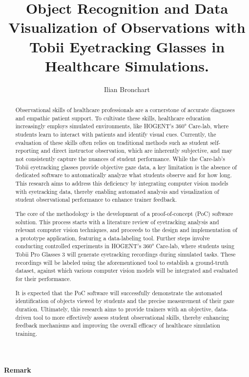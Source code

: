\documentclass[english]{hogent-article}
\title{Object Recognition and Data Visualization of Observations with Tobii Eyetracking Glasses in Healthcare Simulations.}
\author{Ilian Bronchart}
\begin{document}
\begin{abstract}
Observational skills of healthcare professionals are a cornerstone of accurate diagnoses and empathic patient support. 
To cultivate these skills, healthcare education increasingly employs simulated environments, 
like HOGENT's 360° Care-lab, where students learn to interact with patients and identify visual cues. 
Currently, the evaluation of these skills often relies on traditional methods such as student 
self-reporting and direct instructor observation, which are inherently subjective, and may not 
consistently capture the nuances of student performance. 
While the Care-lab's Tobii eyetracking glasses provide objective gaze data, a key limitation is the absence 
of dedicated software to automatically analyze what students observe and for how long.
This research aims to address this deficiency by integrating computer vision models with eyetracking data, 
thereby enabling automated analysis and visualization of student observational performance to enhance trainer feedback.

The core of the methodology is the development of a proof-of-concept (PoC) software solution. 
This process starts with a literature review of eyetracking analysis and relevant computer vision techniques, 
and proceeds to the design and implementation of a prototype application, featuring a data-labeling tool. 
Further steps involve conducting controlled experiments in HOGENT's 360° Care-lab, 
where students using Tobii Pro Glasses 3 will generate eyetracking recordings during simulated tasks. 
These recordings will be labeled using the aforementioned tool to establish a ground-truth dataset, 
against which various computer vision models will be integrated and evaluated for their 
performance.

It is expected that the PoC software will successfully demonstrate the automated identification 
of objects viewed by students and the precise measurement of their gaze duration. 
Ultimately, this research aims to provide trainers with an objective, data-driven tool to more effectively assess 
student observational skills, thereby enhancing feedback mechanisms and improving the overall efficacy of healthcare simulation training.
\end{abstract}

\tableofcontents

\bigskip

\paragraph{Remark}
\end{document}
